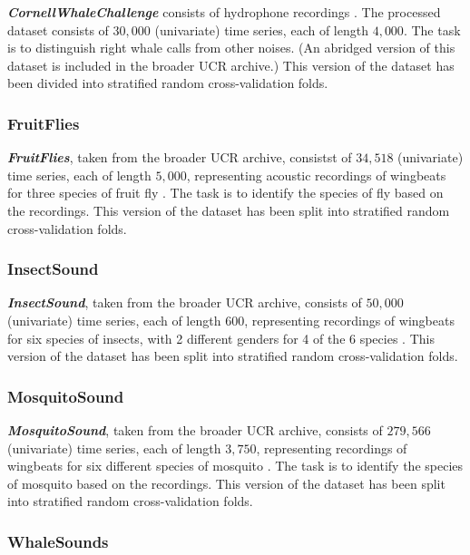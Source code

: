 \documentclass[twoside,11pt,preprint]{article}
\begin{document}
\textbf{\textit{CornellWhaleChallenge}} consists of hydrophone recordings \citep{data_rightwhales_2013}. The processed dataset consists of $30{,}000$ (univariate) time series, each of length $4{,}000$. The task is to distinguish right whale calls from other noises. (An abridged version of this dataset is included in the broader UCR archive.)  This version of the dataset has been divided into stratified random cross-validation folds.

\subsubsection{FruitFlies}

\textbf{\textit{FruitFlies}}, taken from the broader UCR archive, consistst of $34{,}518$ (univariate) time series, each of length $5{,}000$, representing acoustic recordings of wingbeats for three species of fruit fly \citep{data_fruitflies_2016,flynn_2022}. The task is to identify the species of fly based on the recordings. This version of the dataset has been split into stratified random cross-validation folds.

\subsubsection{InsectSound}

\textbf{\textit{InsectSound}}, taken from the broader UCR archive, consists of $50{,}000$ (univariate) time series, each of length $600$, representing recordings of wingbeats for six species of insects, with 2 different genders for 4 of the 6 species \citep{chen_etal_2014,data_insectsound_2014}. This version of the dataset has been split into stratified random cross-validation folds.

\subsubsection{MosquitoSound}

\textbf{\textit{MosquitoSound}}, taken from the broader UCR archive, consists of $279{,}566$ (univariate) time series, each of length $3{,}750$, representing recordings of wingbeats for six different species of mosquito \citep{fanioudakis_etal_2018,data_mosquitosound_2018}. The task is to identify the species of mosquito based on the recordings. This version of the dataset has been split into stratified random cross-validation folds.

\subsubsection{WhaleSounds}
\end{document}

